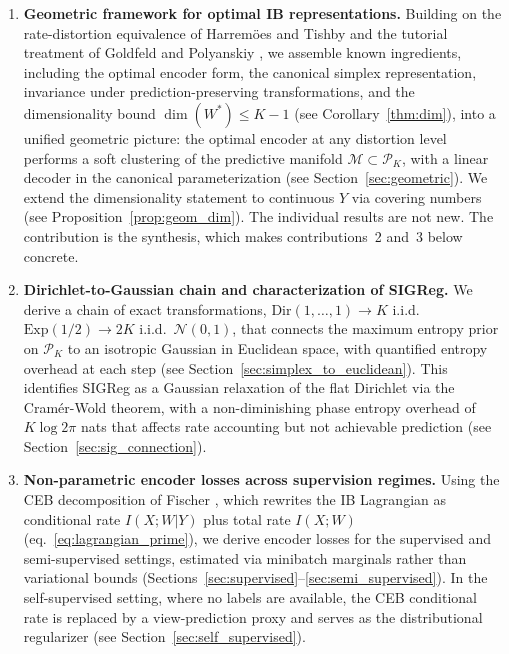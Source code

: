 \documentclass[11pt]{article}
\begin{document}
\begin{enumerate}
    \item \textbf{Geometric framework for optimal IB representations.}
    Building on the rate-distortion equivalence of
    Harrem\"oes and Tishby \cite{harremoes2007information} and the
    tutorial treatment of Goldfeld and Polyanskiy
    \cite{goldfeld2020information},     we assemble known ingredients,
    including the optimal encoder form, the canonical simplex
    representation, invariance under prediction-preserving
    transformations, and the dimensionality bound
    $\dim(W^*)\leq K{-}1$ (see Corollary~\ref{thm:dim}),
    into a unified geometric picture: the optimal encoder at any distortion level performs a
    soft clustering of the predictive manifold
    $\mathcal{M}\subset\mathcal{P}_K$, with a linear decoder in the
    canonical parameterization
    (see Section~\ref{sec:geometric}).
    We extend the dimensionality statement to continuous $Y$ via
    covering numbers (see Proposition~\ref{prop:geom_dim}).
    The individual results are not new. The contribution is the
    synthesis, which makes contributions~2 and~3 below concrete.

    \item \textbf{Dirichlet-to-Gaussian chain and characterization of
    SIGReg.}
    We derive a chain of exact transformations,
    $\mathrm{Dir}(1,\ldots,1)\to K$ i.i.d.\
    $\mathrm{Exp}(1/2)\to 2K$ i.i.d.\ $\mathcal{N}(0,1)$, that
    connects the maximum entropy prior on $\mathcal{P}_K$ to an
    isotropic Gaussian in Euclidean space, with quantified entropy
    overhead at each step
    (see Section~\ref{sec:simplex_to_euclidean}).
    This identifies SIGReg \cite{balestriero2025lejepa} as a
    Gaussian relaxation of the flat Dirichlet via the Cram\'er-Wold
    theorem, with a non-diminishing phase entropy overhead of
    $K\log 2\pi$ nats that affects rate accounting but not
    achievable prediction
    (see Section~\ref{sec:sig_connection}).

    \item \textbf{Non-parametric encoder losses across supervision
    regimes.}
    Using the CEB decomposition of Fischer
    \cite{fischer2020conditional}, which rewrites the IB Lagrangian as
    conditional rate $I(X;W|Y)$ plus total rate $I(X;W)$
    (eq.~\ref{eq:lagrangian_prime}), we derive encoder losses for
    the supervised and semi-supervised settings, estimated via
    minibatch marginals rather than variational bounds
    (Sections~\ref{sec:supervised}--\ref{sec:semi_supervised}).
    In the self-supervised setting, where no labels are available,
    the CEB conditional rate is replaced by a view-prediction proxy
    and serves as the distributional
    regularizer (see Section~\ref{sec:self_supervised}).
\end{enumerate}
\end{document}
